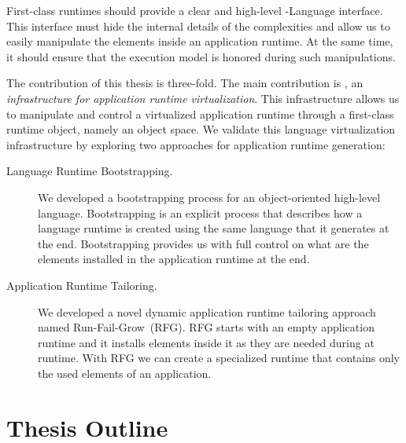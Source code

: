First-class runtimes should provide a clear and high-level \VM-Language interface. This interface must hide the internal details of the \VM complexities and allow us to easily manipulate the elements inside an application runtime. At the same time, it should ensure that the \VM execution model is honored during such manipulations.

The contribution of this thesis is three-fold. The main contribution is \Vtt, an \emph{infrastructure for application runtime virtualization}. This infrastructure allows us to manipulate and control a virtualized application runtime through a first-class runtime object, namely an object space.
We validate this language virtualization infrastructure by exploring two approaches for application runtime generation:
\begin{description}
\item[Language Runtime Bootstrapping.] We developed a bootstrapping process for an object-oriented high-level language. Bootstrapping is an explicit process that describes how a language runtime is created using the same language that it generates at the end. Bootstrapping provides us with full control on what are the elements installed in the application runtime at the end.
\item[Application Runtime Tailoring.] We developed a novel dynamic application runtime tailoring approach named Run-Fail-Grow~(RFG). RFG starts with an empty application runtime and it installs elements inside it as they are needed during at runtime. With RFG we can create a specialized runtime that contains only the used elements of an application.
\end{description}

\section{Thesis Outline}

\begin{description}
\item[] 

\item[] 
	
\item[] 

\item[] 

\item[] 

\end{description}



